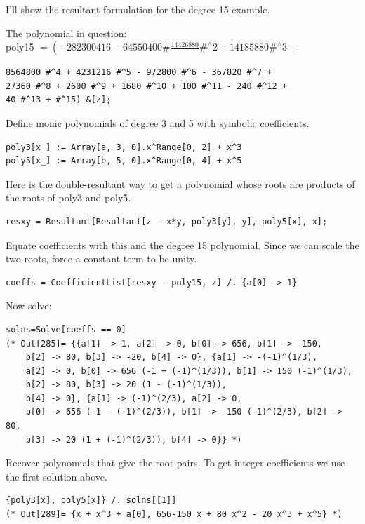 \documentclass[10pt]{article}
\begin{document}
I'll show the resultant formulation for the degree 15 example.

The polynomial in question:\\
poly15 $=\left(-282300416-64550400 \# \frac{14426880}{} \#^{\wedge} 2-14185880 \#^{\wedge} 3+\right.$

\begin{verbatim}
8564800 #^4 + 4231216 #^5 - 972800 #^6 - 367820 #^7 +
27360 #^8 + 2600 #^9 + 1680 #^10 + 100 #^11 - 240 #^12 +
40 #^13 + #^15) &[z];
\end{verbatim}

Define monic polynomials of degree 3 and 5 with symbolic coefficients.

\begin{verbatim}
poly3[x_] := Array[a, 3, 0].x^Range[0, 2] + x^3
poly5[x_] := Array[b, 5, 0].x^Range[0, 4] + x^5
\end{verbatim}

Here is the double-resultant way to get a polynomial whose roots are products of the roots of poly3 and poly5.

\begin{verbatim}
resxy = Resultant[Resultant[z - x*y, poly3[y], y], poly5[x], x];
\end{verbatim}

Equate coefficients with this and the degree 15 polynomial. Since we can scale the two roots, force a constant term to be unity.

\begin{verbatim}
coeffs = CoefficientList[resxy - poly15, z] /. {a[0] -> 1}
\end{verbatim}

Now solve:

\begin{verbatim}
solns=Solve[coeffs == 0]
(* Out[285]= {{a[1] -> 1, a[2] -> 0, b[0] -> 656, b[1] -> -150,
    b[2] -> 80, b[3] -> -20, b[4] -> 0}, {a[1] -> -(-1)^(1/3),
    a[2] -> 0, b[0] -> 656 (-1 + (-1)^(1/3)), b[1] -> 150 (-1)^(1/3),
    b[2] -> 80, b[3] -> 20 (1 - (-1)^(1/3)),
    b[4] -> 0}, {a[1] -> (-1)^(2/3), a[2] -> 0,
    b[0] -> 656 (-1 - (-1)^(2/3)), b[1] -> -150 (-1)^(2/3), b[2] -> 80,
    b[3] -> 20 (1 + (-1)^(2/3)), b[4] -> 0}} *)
\end{verbatim}

Recover polynomials that give the root pairs. To get integer coefficients we use the first solution above.

\begin{verbatim}
{poly3[x], poly5[x]} /. solns[[1]]
(* Out[289]= {x + x^3 + a[0], 656-150 x + 80 x^2 - 20 x^3 + x^5} *)
\end{verbatim}
\end{document}
